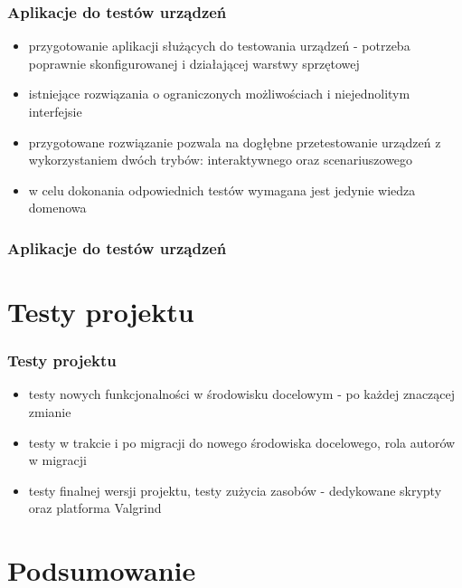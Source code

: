 \documentclass[10pt]{beamer}
\begin{document}
\begin{frame}
\frametitle{Aplikacje do testów urządzeń}
    \begin{itemize}
        \item przygotowanie aplikacji służących do testowania urządzeń - potrzeba poprawnie skonfigurowanej i działającej warstwy sprzętowej
        \item istniejące rozwiązania o ograniczonych możliwościach i niejednolitym interfejsie
        \item przygotowane rozwiązanie pozwala na dogłębne przetestowanie urządzeń z wykorzystaniem dwóch trybów: interaktywnego oraz scenariuszowego
        \item w celu dokonania odpowiednich testów wymagana jest jedynie wiedza domenowa
    \end{itemize}
\end{frame}

\begin{frame}
    \frametitle{Aplikacje do testów urządzeń}
    
\end{frame}

\section{Testy projektu}

\begin{frame}
\frametitle{Testy projektu}
    \begin{itemize}
        \item testy nowych funkcjonalności w środowisku docelowym - po każdej znaczącej zmianie
        \item testy w trakcie i po migracji do nowego środowiska docelowego, rola autorów w migracji
        \item testy finalnej wersji projektu, testy zużycia zasobów - dedykowane skrypty oraz platforma Valgrind
    \end{itemize}
\end{frame}

\section{Podsumowanie}
\end{document}
